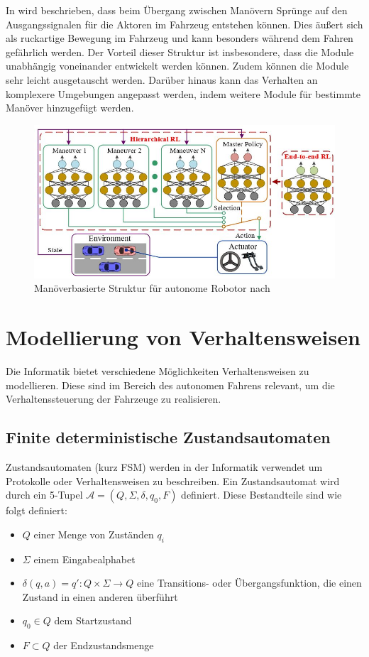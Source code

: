 In \cite{DUA20} wird beschrieben, dass beim Übergang zwischen Manövern Sprünge auf den Ausgangssignalen für die Aktoren im Fahrzeug entstehen können. Dies äußert sich als ruckartige Bewegung im Fahrzeug und kann besonders während dem Fahren gefährlich werden. Der Vorteil dieser Struktur ist insbesondere, dass die Module unabhängig voneinander entwickelt werden können. Zudem können die Module sehr leicht ausgetauscht werden. Darüber hinaus kann das Verhalten an komplexere Umgebungen angepasst werden, indem weitere Module für bestimmte Manöver hinzugefügt werden.

\FloatBarrier
\begin{figure}[h]
  \centering
  \includegraphics[width=\textwidth]{images/stand_der_technik/NN_SW_Structure.JPG}
  \caption[Manöverbasierte Softwarestruktur für autonome Robotor]{Manöverbasierte Struktur für autonome Robotor nach \cite{DUA20}}
  \label{NN:SW}
\end{figure}
\FloatBarrier

\section{Modellierung von Verhaltensweisen}
Die Informatik bietet verschiedene Möglichkeiten Verhaltensweisen zu modellieren. Diese sind im Bereich des autonomen Fahrens relevant, um die Verhaltenssteuerung der Fahrzeuge zu realisieren.

\subsection{Finite deterministische Zustandsautomaten}
Zustandsautomaten (kurz FSM) werden in der Informatik verwendet um Protokolle oder Verhaltensweisen zu beschreiben. Ein Zustandsautomat wird durch ein 5-Tupel $\mathcal{A} = (Q, \Sigma, \delta, q_0, F)$ definiert. Diese Bestandteile sind wie folgt definiert:
\begin{itemize}
 \item $Q$ einer Menge von Zuständen $q_i$
 \item $\Sigma$ einem Eingabealphabet
 \item $\delta(q, a)=q': Q \times \Sigma \rightarrow Q$ eine Transitions- oder Übergangsfunktion, die einen Zustand in einen anderen überführt
 \item $q_0 \in Q$ dem Startzustand
 \item $F \subset Q$ der Endzustandsmenge
\end{itemize}

